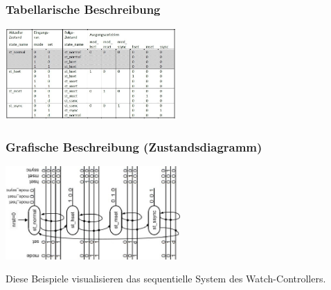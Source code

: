	\begin{multicols}{2}
		\subsubsection{Tabellarische Beschreibung}
			\includegraphics[width=0.49\textwidth]{pics/zustandstabelle}
		\columnbreak
		
		\subsubsection{Grafische Beschreibung (Zustandsdiagramm)}
			\includegraphics[width=0.5\textwidth]{pics/zustandsdiagramm}
	\end{multicols}
	Diese Beispiele visualisieren das sequentielle System des Watch-Controllers.
	
